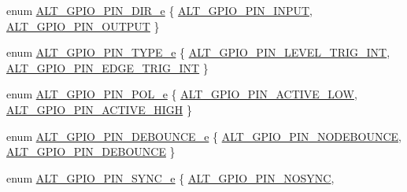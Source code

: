 \begin{DoxyCompactItemize}
\item 
enum \mbox{\hyperlink{group__ALT__GPIO__API__CONFIG_ga788d8a869480b2f3743c8ba1c382df67}{A\+L\+T\+\_\+\+G\+P\+I\+O\+\_\+\+P\+I\+N\+\_\+\+D\+I\+R\+\_\+e}} \{ \mbox{\hyperlink{group__ALT__GPIO__API__CONFIG_gga788d8a869480b2f3743c8ba1c382df67a88b60b11c04f02163831d396f5d113e6}{A\+L\+T\+\_\+\+G\+P\+I\+O\+\_\+\+P\+I\+N\+\_\+\+I\+N\+P\+UT}}, 
\mbox{\hyperlink{group__ALT__GPIO__API__CONFIG_gga788d8a869480b2f3743c8ba1c382df67ad0e3bcc78f61ace75e7726c1bb6e7067}{A\+L\+T\+\_\+\+G\+P\+I\+O\+\_\+\+P\+I\+N\+\_\+\+O\+U\+T\+P\+UT}}
 \}
\item 
enum \mbox{\hyperlink{group__ALT__GPIO__API__CONFIG_gae750a74a5eafd2f86cf1c11749471465}{A\+L\+T\+\_\+\+G\+P\+I\+O\+\_\+\+P\+I\+N\+\_\+\+T\+Y\+P\+E\+\_\+e}} \{ \mbox{\hyperlink{group__ALT__GPIO__API__CONFIG_ggae750a74a5eafd2f86cf1c11749471465af9089643fe47a249dd0f6a0238a38d1b}{A\+L\+T\+\_\+\+G\+P\+I\+O\+\_\+\+P\+I\+N\+\_\+\+L\+E\+V\+E\+L\+\_\+\+T\+R\+I\+G\+\_\+\+I\+NT}}, 
\mbox{\hyperlink{group__ALT__GPIO__API__CONFIG_ggae750a74a5eafd2f86cf1c11749471465a3fde691fa9fe922b5f850e4bb0455849}{A\+L\+T\+\_\+\+G\+P\+I\+O\+\_\+\+P\+I\+N\+\_\+\+E\+D\+G\+E\+\_\+\+T\+R\+I\+G\+\_\+\+I\+NT}}
 \}
\item 
enum \mbox{\hyperlink{group__ALT__GPIO__API__CONFIG_ga0b9b54154f761155bf331b3f0e794633}{A\+L\+T\+\_\+\+G\+P\+I\+O\+\_\+\+P\+I\+N\+\_\+\+P\+O\+L\+\_\+e}} \{ \mbox{\hyperlink{group__ALT__GPIO__API__CONFIG_gga0b9b54154f761155bf331b3f0e794633af05ba0e12a3c4da0e3dd1435fb38da47}{A\+L\+T\+\_\+\+G\+P\+I\+O\+\_\+\+P\+I\+N\+\_\+\+A\+C\+T\+I\+V\+E\+\_\+\+L\+OW}}, 
\mbox{\hyperlink{group__ALT__GPIO__API__CONFIG_gga0b9b54154f761155bf331b3f0e794633a0e22eed4ec632a4ce7085bf727c68855}{A\+L\+T\+\_\+\+G\+P\+I\+O\+\_\+\+P\+I\+N\+\_\+\+A\+C\+T\+I\+V\+E\+\_\+\+H\+I\+GH}}
 \}
\item 
enum \mbox{\hyperlink{group__ALT__GPIO__API__CONFIG_ga0c161a7f66ca55815c2e41bb914ded83}{A\+L\+T\+\_\+\+G\+P\+I\+O\+\_\+\+P\+I\+N\+\_\+\+D\+E\+B\+O\+U\+N\+C\+E\+\_\+e}} \{ \mbox{\hyperlink{group__ALT__GPIO__API__CONFIG_gga0c161a7f66ca55815c2e41bb914ded83a764fad268fd316a841e43756d3aa9032}{A\+L\+T\+\_\+\+G\+P\+I\+O\+\_\+\+P\+I\+N\+\_\+\+N\+O\+D\+E\+B\+O\+U\+N\+CE}}, 
\mbox{\hyperlink{group__ALT__GPIO__API__CONFIG_gga0c161a7f66ca55815c2e41bb914ded83a9db9dc40716d5532123e40939eb5416c}{A\+L\+T\+\_\+\+G\+P\+I\+O\+\_\+\+P\+I\+N\+\_\+\+D\+E\+B\+O\+U\+N\+CE}}
 \}
\item 
enum \mbox{\hyperlink{group__ALT__GPIO__API__CONFIG_ga77dc8aa651f28ec168db805e9053fe46}{A\+L\+T\+\_\+\+G\+P\+I\+O\+\_\+\+P\+I\+N\+\_\+\+S\+Y\+N\+C\+\_\+e}} \{ \mbox{\hyperlink{group__ALT__GPIO__API__CONFIG_gga77dc8aa651f28ec168db805e9053fe46afc867498ec4a9a01c25cb7015c050a3d}{A\+L\+T\+\_\+\+G\+P\+I\+O\+\_\+\+P\+I\+N\+\_\+\+N\+O\+S\+Y\+NC}}, 

\end{DoxyCompactItemize}
